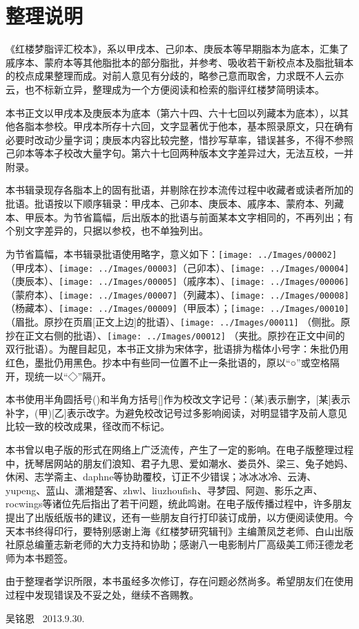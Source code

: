 \chapter{整理说明}

《红楼梦脂评汇校本》，系以甲戌本、己卯本、庚辰本等早期脂本为底本，汇集了戚序本、蒙府本等其他脂批本的部分脂批，并参考、吸收若干新校点本及脂批辑本的校点成果整理而成。对前人意见有分歧的，略参己意而取舍，力求既不人云亦云，也不标新立异，整理成为一个方便阅读和检索的脂评红楼梦简明读本。

本书正文以甲戌本及庚辰本为底本（第六十四、六十七回以列藏本为底本），以其他各脂本参校。甲戌本所存十六回，文字显著优于他本，基本照录原文，只在确有必要时改动少量字词；庚辰本内容比较完整，惜抄写草率，错误甚多，不得不参照己卯本等本子校改大量字句。第六十七回两种版本文字差异过大，无法互校，一并附录。

本书辑录现存各脂本上的固有批语，并剔除在抄本流传过程中收藏者或读者所加的批语。批语按以下顺序辑录：甲戌本、己卯本、庚辰本、戚序本、蒙府本、列藏本、甲辰本。为节省篇幅，后出版本的批语与前面某本文字相同的，不再列出；有个别文字差异的，只据以参校，也不单独列出。

为节省篇幅，本书辑录批语使用略字，意义如下：\texttt{[image: ../Images/00002]}（甲戌本）、\texttt{[image: ../Images/00003]}（己卯本）、\texttt{[image: ../Images/00004]}（庚辰本）、\texttt{[image: ../Images/00005]}（戚序本）、\texttt{[image: ../Images/00006]}（蒙府本）、\texttt{[image: ../Images/00007]}（列藏本）、\texttt{[image: ../Images/00008]}（杨藏本）、\texttt{[image: ../Images/00009]}（甲辰本）；\texttt{[image: ../Images/00010]} （眉批。原抄在页眉{[}正文上边{]}的批语）、\texttt{[image: ../Images/00011]} （侧批。原抄在正文右侧的批语）、\texttt{[image: ../Images/00012]}  （夹批。原抄在正文中间的双行批语）。为醒目起见，本书正文排为宋体字，批语排为楷体小号字：朱批仍用红色，墨批仍用黑色。抄本中有些同一位置不止一条批语的，原以``○''或空格隔开，现统一以``◇''隔开。

本书使用半角圆括号()和半角方括号{[}{]}作为校改文字记号：(某)表示删字，{[}某{]}表示补字，(甲){[}乙{]}表示改字。为避免校改记号过多影响阅读，对明显错字及前人意见比较一致的校改成果，径改而不标记。

本书曾以电子版的形式在网络上广泛流传，产生了一定的影响。在电子版整理过程中，抚琴居网站的朋友们浪知、君子九思、爱如潮水、娄员外、梁三、兔子她妈、休闲、志学斋主、daphne等协助覆校，订正不少错误；冰冰冰冷、云涛、yupeng、蓝山、潇湘楚客、zhwl、liuzhoufish、寻梦园、阿迦、影乐之声、rocwings等诸位先后指出了若干问题，统此鸣谢。在电子版传播过程中，许多朋友提出了出版纸版书的建议，还有一些朋友自行打印装订成册，以方便阅读使用。今天本书终得印行，要特别感谢上海《红楼梦研究辑刊》主编萧凤芝老师、白山出版社原总编董志新老师的大力支持和协助；感谢八一电影制片厂高级美工师汪德龙老师为本书题签。

由于整理者学识所限，本书虽经多次修订，存在问题必然尚多。希望朋友们在使用过程中发现错误及不妥之处，继续不吝赐教。

\begin{flushright}
	吴铭恩 ~2013.9.30.
\end{flushright}~~~~
